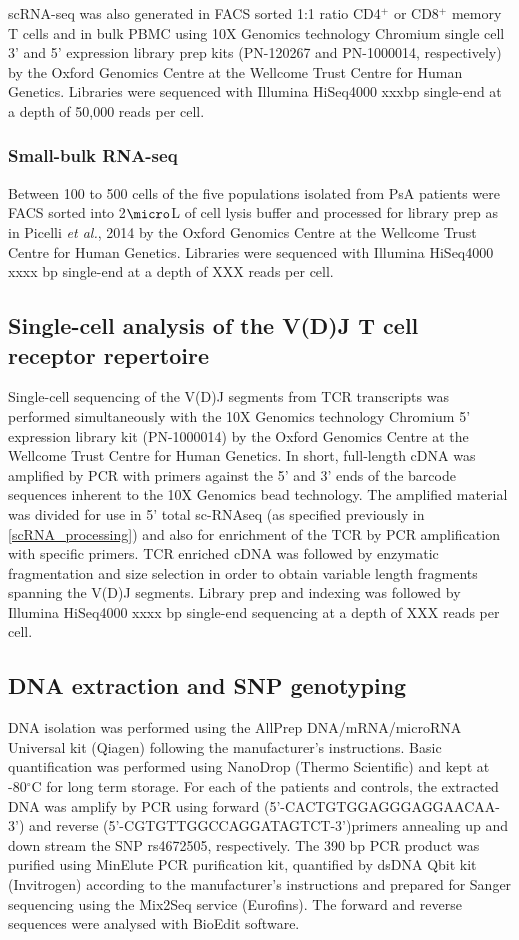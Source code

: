 scRNA-seq was also generated in FACS sorted 1:1 ratio CD4$^{+}$ or CD8$^{+}$ memory T cells and in bulk PBMC using 10X Genomics technology Chromium single cell 3' and 5' expression library prep kits (PN-120267 and PN-1000014, respectively) by the Oxford Genomics Centre at the Wellcome Trust Centre for Human Genetics. Libraries were sequenced with Illumina HiSeq4000 xxxbp single-end at a depth of 50,000 reads per cell.

\subsubsection{Small-bulk RNA-seq } 
Between 100 to 500 cells of the five populations isolated from PsA patients were FACS sorted into 2$\micro$L of cell lysis buffer and processed for library prep as in Picelli \textit{et al.}, 2014 by the Oxford Genomics Centre at the Wellcome Trust Centre for Human Genetics. Libraries were sequenced with Illumina HiSeq4000 xxxx bp single-end at a depth of XXX reads per cell.


\subsection{Single-cell analysis of the V(D)J T cell receptor repertoire}
Single-cell sequencing of the V(D)J segments from TCR transcripts was performed simultaneously with the 10X Genomics technology Chromium 5' expression library kit (PN-1000014) by the Oxford Genomics Centre at the Wellcome Trust Centre for Human Genetics. In short, full-length cDNA was amplified by PCR with primers against the 5’ and 3’ ends of the barcode sequences inherent to the 10X Genomics bead technology. The amplified material was divided for use in 5' total sc-RNAseq (as specified previously in \ref{scRNA_processing}) and also for enrichment of the TCR by PCR amplification with specific primers. TCR enriched cDNA was followed by enzymatic fragmentation and size selection in order to obtain variable length fragments spanning the V(D)J segments. Library prep and indexing was followed by Illumina HiSeq4000 xxxx bp single-end sequencing at a depth of XXX reads per cell.

\subsection{DNA extraction and SNP genotyping}
DNA isolation was performed using the AllPrep DNA/mRNA/microRNA Universal kit (Qiagen) following the manufacturer's instructions. Basic quantification was performed using NanoDrop (Thermo Scientific) and kept at -80{$^\circ$}C for long term storage. For each of the patients and controls, the extracted DNA was amplify by PCR using forward (5'-CACTGTGGAGGGAGGAACAA-3') and reverse (5'-CGTGTTGGCCAGGATAGTCT-3')primers annealing up and down stream the SNP rs4672505, respectively. The 390 bp PCR product was purified using MinElute PCR purification kit, quantified by dsDNA Qbit kit (Invitrogen) according to the manufacturer's instructions and prepared for Sanger sequencing using the Mix2Seq service (Eurofins). The forward and reverse sequences were analysed with BioEdit software.



